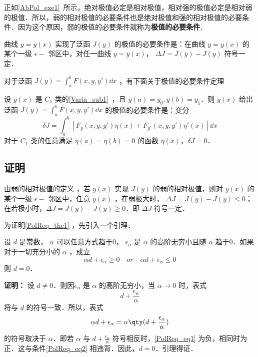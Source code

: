 
正如\autoref{AbPol_exe1}~所示，绝对极值必定是相对极值，相对强的极值必定是相对弱的极值．所以，弱的相对极值的必要条件也是绝对极值和强的相对极值的必要条件．因为这个原因，弱的极值的必要条件就称为\textbf{极值的必要条件}．

曲线 $y=y(x)$ 实现了泛函 $J(y)$ 的极值的必要条件是：在曲线 $y=y(x)$ 的某个一级 $\epsilon-$ 邻区中，对任一曲线 $y=\overline{y}(x)$， $\Delta J=J(\overline{y})-J(y)$ 符号一定．

对于泛函 $J(y)=\int_a^bF(x,y,y')\dd x$ ，有下面关于极值的必要条件定理
\begin{theorem}{}\label{PolReq_the1}
设 $y(x)$ 是 $C_1$ 类的\autoref{Varia_sub1}~，且 $y(a)=y_0,y(b)=y_1$．则 $y(x)$ 给出泛函 $J(y)=\int_a^bF(x,y,y')\dd x$ 的极值的必要条件是：变分
\begin{equation}
\delta J=\int_a^b[F_y(x,y,y')\eta(x)+F_{y'}(x,y,y')\eta'(x)]\dd x
\end{equation}
对于 $C_1$ 类的任意满足 $\eta(a)=\eta(b)=0$ 的函数 $\eta(x)$，$\delta J=0$．
\end{theorem}
\subsection{证明}
由弱的相对极值的定义 ，若 $y(x)$ 实现 $J(y)$ 的弱的相对极值，则对 $y(x)$ 的某个一级 $\epsilon-$ 邻区中，任意 $\overline{y}(x)$ ，在弱极大时， $\Delta J=J(\overline{y})-J(y)\leq 0$；在若极小时，$\Delta J=J(\overline{y})-J(y)\geq 0$．即 $\Delta J$ 符号一定．

为证明\autoref{PolReq_the1} ，先引入一个引理．
\begin{lemma}{}
设 $d$ 是常数， $\alpha$ 可以任意方式趋于0， $\epsilon_\alpha$ 是 $\alpha$ 的高阶无穷小且随 $\alpha$ 趋于0．如果对于一切充分小的 $\alpha$ ，成立 
\begin{equation}\label{PolReq_eq2}
\alpha d+\epsilon_\alpha\geq0\quad or\quad\alpha d+\epsilon_\alpha\leq0
\end{equation}
则 $d=0$．
\end{lemma}
\textbf{证明：} 设 $d\neq 0$．则因$\epsilon_\alpha$ 是 $\alpha$ 的高阶无穷小，当 $\alpha\rightarrow0$ 时，表式
\begin{equation}
d+\frac{\epsilon_\alpha}{\alpha}
\end{equation}
 将与 $d$ 的符号一致．所以，表式
 \begin{equation}\label{PolReq_eq1}
 \alpha d+\epsilon_\alpha=\alpha\qty(d+\frac{\epsilon_\alpha}{\alpha})
 \end{equation}
 的符号取决于 $\alpha$．即若 $\alpha$ 与 $d+\frac{\epsilon_\alpha}{\alpha}$ 符号相反时，\autoref{PolReq_eq1} 为负，相同时为正．这与条件\autoref{PolReq_eq2} 相违背．因此，$d=0$．引理得证．
